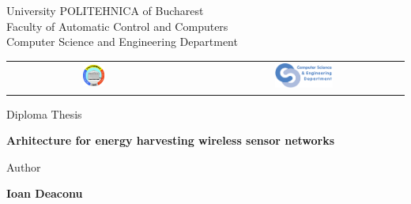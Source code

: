 


\pagestyle{empty}
\sffamily

\noindent
\begin{center}
	\Large
	University POLITEHNICA of Bucharest\\
	Faculty of Automatic Control and Computers \\
	Computer Science and Engineering Department \\
	\begin{table}[h]
		\begin{center}
			\begin{tabular}{cccc}
				\includegraphics[width=0.13\textwidth]
				{img/upb.png}
				& & &
				\includegraphics[width=0.30\textwidth]
				{img/cs.png}
			\end{tabular}
		\end{center}
	\end{table}
\end{center}

\vfill\vfill
\begin{center}
	\Large
	Diploma Thesis\\
\end{center}

\vfill
\begin{center}
	\HUGE\bfseries
	Arhitecture for energy harvesting wireless sensor networks\\
	\vfill
	\large
\end{center}

\vfill
\begin{center}
	\Large
	Author
\end{center}

\begin{center}
	\huge\bfseries
	Ioan Deaconu
\end{center}

